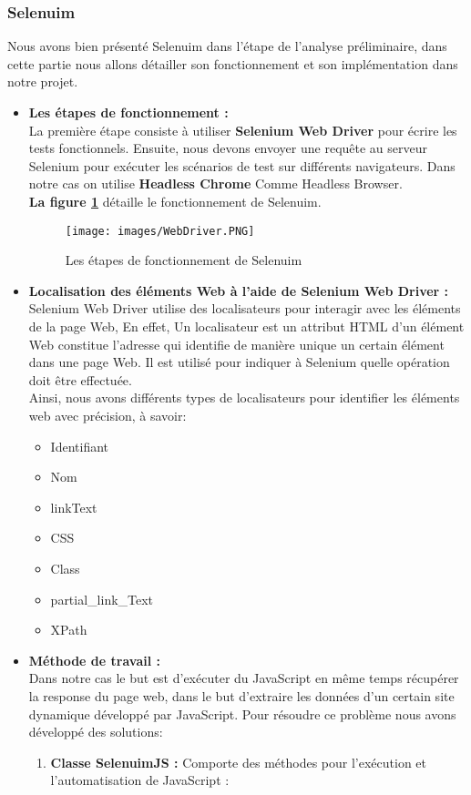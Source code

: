 \subsubsection{Selenuim}
Nous avons bien présenté Selenuim dans l’étape de l’analyse préliminaire, dans cette partie nous allons détailler son fonctionnement et son implémentation dans notre projet. 
\begin{itemize}[label=,font=\normalsize]
        \addtolength{\itemindent}{0cm}
        \item\textbf{Les étapes de fonctionnement :} \\
La première étape consiste à utiliser \textbf{Selenium Web Driver} pour écrire les tests fonctionnels. Ensuite, nous devons envoyer une requête au serveur Selenium pour exécuter les scénarios de test sur différents navigateurs. Dans notre cas on utilise \textbf{Headless Chrome} Comme Headless Browser.\\
\textbf{La figure \ref{fig:fonctionnement}} détaille le fonctionnement de Selenuim.
\begin{figure}[H]
            \centering
            \texttt{[image: images/WebDriver.PNG]}
            \caption{Les étapes de fonctionnement de Selenuim \cite{EtapeSelenuim}}
            \label{fig:fonctionnement}  
        \end{figure}
        \item\textbf{Localisation des éléments Web à l’aide de Selenium Web Driver :} \\
        Selenium Web Driver utilise des localisateurs pour interagir avec les éléments de la page Web, En effet, Un localisateur est un attribut HTML d'un élément Web constitue l'adresse qui identifie de manière unique un certain élément dans une page Web. Il est utilisé pour indiquer à Selenium quelle opération doit être effectuée. \\
        Ainsi, nous avons différents types de localisateurs pour identifier les éléments web avec précision, à savoir:
        \begin{itemize}
            \item Identifiant
            \item Nom
            \item linkText
            \item CSS
            \item Class
            \item partial\_link\_Text
            \item XPath
        \end{itemize}
        \item\textbf{Méthode de travail :} \\
        Dans notre cas le but est d’exécuter du JavaScript en même temps récupérer la response du page web, dans le but d’extraire les données d’un certain site dynamique développé par JavaScript.
        Pour résoudre ce problème nous avons développé des solutions:
        \begin{enumerate}
            \item\textbf{Classe SelenuimJS :} Comporte des méthodes pour l’exécution et l’automatisation de JavaScript : 
            

\end{enumerate}
\end{itemize}
